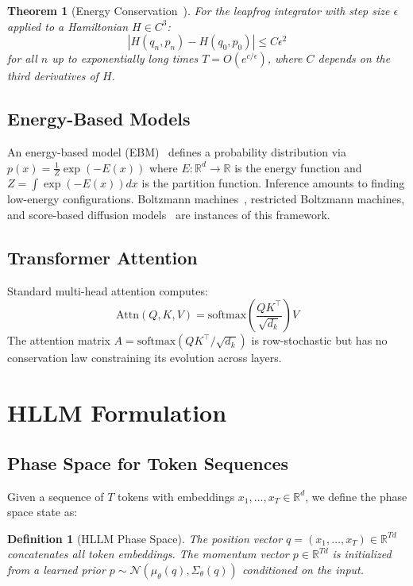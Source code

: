 \documentclass[11pt,letterpaper]{article}
\newtheorem{theorem}{Theorem}[section]
\newtheorem{definition}{Definition}[section]
\newcommand{\R}{\mathbb{R}}
\begin{document}
\begin{theorem}[Energy Conservation~\cite{leimkuhler2004simulating}]
\label{thm:conservation}
For the leapfrog integrator with step size $\epsilon$ applied to a Hamiltonian $H \in C^3$:
\[
|H(q_n, p_n) - H(q_0, p_0)| \leq C \epsilon^2
\]
for all $n$ up to exponentially long times $T = O(e^{c/\epsilon})$, where $C$ depends on the third derivatives of $H$.
\end{theorem}

\subsection{Energy-Based Models}

An energy-based model (EBM)~\cite{lecun2006tutorial} defines a probability distribution via $p(x) = \frac{1}{Z} \exp(-E(x))$ where $E: \R^d \to \R$ is the energy function and $Z = \int \exp(-E(x)) dx$ is the partition function. Inference amounts to finding low-energy configurations. Boltzmann machines~\cite{hinton2006reducing}, restricted Boltzmann machines, and score-based diffusion models~\cite{song2021score} are instances of this framework.

\subsection{Transformer Attention}

Standard multi-head attention computes:
\[
\text{Attn}(Q, K, V) = \text{softmax}\!\left(\frac{QK^\top}{\sqrt{d_k}}\right) V
\]
The attention matrix $A = \text{softmax}(QK^\top / \sqrt{d_k})$ is row-stochastic but has no conservation law constraining its evolution across layers.

\section{HLLM Formulation}
\label{sec:formulation}

\subsection{Phase Space for Token Sequences}

Given a sequence of $T$ tokens with embeddings $x_1, \ldots, x_T \in \R^d$, we define the phase space state as:

\begin{definition}[HLLM Phase Space]
The position vector $q = (x_1, \ldots, x_T) \in \R^{Td}$ concatenates all token embeddings. The momentum vector $p \in \R^{Td}$ is initialized from a learned prior $p \sim \mathcal{N}(\mu_\theta(q), \Sigma_\theta(q))$ conditioned on the input.
\end{definition}
\end{document}
